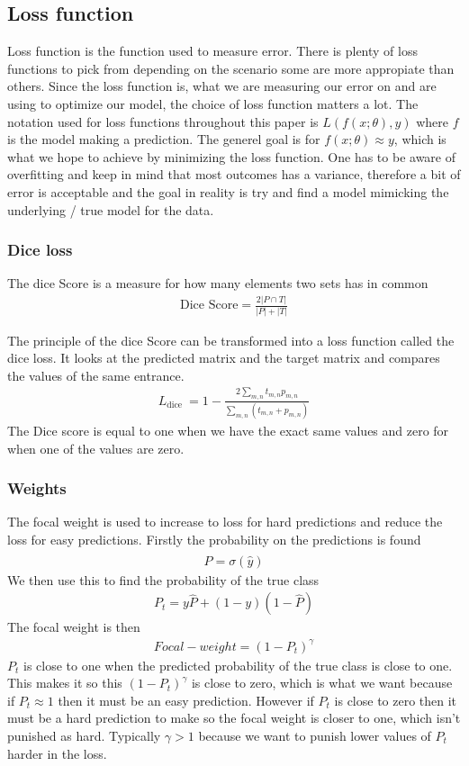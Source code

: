 \documentclass[a4paper,12pt]{article}
\begin{document}
\subsection{Loss function}
Loss function is the function used to measure error. There is plenty of loss functions to pick from depending on the scenario some are more appropiate than others.
Since the loss function is, what we are measuring our error on and are using to optimize our model, the choice of loss function matters a lot. The notation used for loss functions throughout this paper is $L(f(x; \theta), y)$ where $f$ is the model making a prediction. The generel goal is for $f(x; \theta) \approx y$, which is what we hope to achieve by minimizing the loss function.
One has to be aware of overfitting and keep in mind that most outcomes has a variance, therefore a bit of error is acceptable and the goal in reality is try and find a model mimicking the underlying / true model for the data.
\subsubsection{Dice loss}
The dice Score is a measure for how many elements two sets has in common
\begin{align}
  \text{Dice Score} =\frac{2|P \cap T|}{|P|+|T|}
\end{align}

The principle of the dice Score can be transformed into a loss function called the dice loss. It looks at the predicted matrix and the target matrix and compares the values of the same entrance.
\begin{align}
  L_{\text {dice }}=1-\frac{2 \sum_{m,n} t_{m,n} p_{m,n}}{\sum_{m,n}\left(t_{m,n}+p_{m,n}\right)}
\end{align}
The Dice score is equal to one when we have the exact same values and zero for when one of the values are zero.  
\subsubsection{Weights}
The focal weight is used to increase to loss for hard predictions and reduce the loss for easy predictions. Firstly the probability on the predictions is found
\begin{align}
  \hat{P} = \sigma(\hat{y})
\end{align}
We then use this to find the probability of the true class
\begin{align}
  P_t = y \hat{P} + (1-y)(1-\hat{P})
\end{align}
The focal weight is then
\begin{align}
  Focal-weight = (1-P_t)^\gamma
\end{align}
$P_t$ is close to one when the predicted probability of the true class is close to one. This makes it so this $(1-P_t)^\gamma$ is close to zero, which is what we want because if $P_t \approx 1$ then it must be an easy prediction. However if $P_t$ is close to zero then it must be a hard prediction to make so the focal weight is closer to one, which isn't punished as hard. Typically $\gamma > 1$ because we want to punish lower values of $P_t$ harder in the loss.
\end{document}
